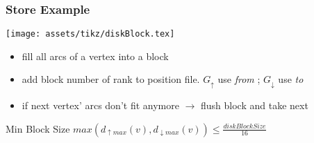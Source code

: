 \begin{frame}
    \frametitle{Store Example}
    \centering    
    \texttt{[image: assets/tikz/diskBlock.tex]}
    \begin{itemize}
        \item fill all arcs of a vertex into a block 
        \item add block number of rank to position file. $G_\uparrow$ use \textit{from} ; $G_\downarrow$ use \textit{to}  
        \item if next vertex' arcs don't fit anymore $\rightarrow$ flush block and take next 
    \end{itemize}
    \begin{alertblock}{Min Block Size}
        \centering
        $    max(d_{\uparrow max}(v), d_{\downarrow max}(v)) \leqslant  \frac{diskBlockSize}{16}  $
    \end{alertblock}
\end{frame}
